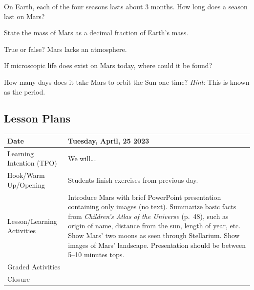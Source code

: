 \documentclass{article}
\numberwithin{equation}{section}
\numberwithin{figure}{section}
\begin{document}
\begin{exercise}
    On Earth, each of the four seasons lasts about 3 months. How long does a season last on Mars?
\end{exercise}

\begin{exercise}
    State the mass of Mars as a decimal fraction of Earth's mass. 
\end{exercise}

\begin{exercise}
    True or false? Mars lacks an atmosphere.
\end{exercise}

\begin{exercise}
    If microscopic life does exist on Mars today, where could it be found?
\end{exercise}

\begin{exercise}
    How many days does it take Mars to orbit the Sun one time? \textit{Hint}: This is known as the period.
\end{exercise}

\clearpage

\subsection*{Lesson Plans}

\begin{tabular}{|m{}|m{}|}
    \hline  
    \cellcolor{black!20}\textbf{Date} &
    \cellcolor{black!20}\textbf{Tuesday, April, 25 2023} \\
    \hline
    Learning Intention (TPO) & We will\ldots. \\
    \hline
    Hook/Warm Up/Opening & Students finish exercises from previous day.\\
    \hline
    Lesson/Learning Activities & Introduce Mars with brief PowerPoint presentation containing only images (no text). Summarize basic facts from \textit{Children's Atlas of the Universe} (p.~48), such as origin of name, distance from the sun, length of year, etc. Show Mars' two moons as seen through Stellarium. Show images of Mars' landscape. Presentation should be between 5--10 minutes tops.\\
    \hline
    Graded Activities & \\
    \hline
    Closure & \\  
    \hline
\end{tabular}
\end{document}
